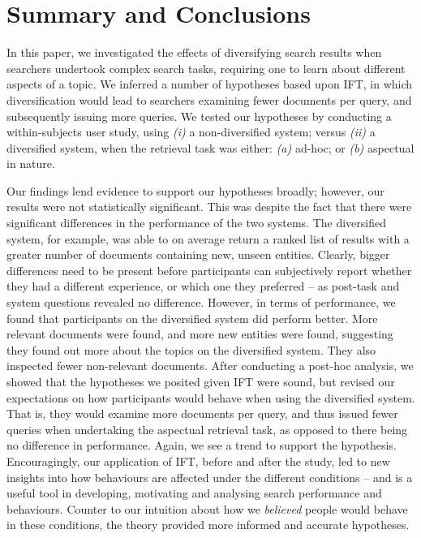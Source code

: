 \section{Summary and Conclusions} \label{sec:conclusion}

In this paper, we investigated the effects of diversifying search results when searchers undertook complex search tasks, requiring one to learn about different aspects of a topic. We inferred a number of hypotheses based upon IFT, in which diversification would lead to searchers examining fewer documents per query, and subsequently issuing more queries. We tested our hypotheses by conducting a within-subjects user study, using \emph{(i)} a non-diversified system; versus \emph{(ii)} a diversified system, when the retrieval task was either: \emph{(a)} ad-hoc; or \emph{(b)} aspectual in nature.

Our findings lend evidence to support our hypotheses broadly; however, our results were not statistically significant. This was despite the fact that there were significant differences in the performance of the two systems. The diversified system, for example, was able to on average return a ranked list of results with a greater number of documents containing new, unseen entities. Clearly, bigger differences need to be present before participants can subjectively report whether they had a different experience, or which one they preferred -- as post-task and system questions revealed no difference. However, in terms of performance, we found that participants on the diversified system did perform better. More relevant documents were found, and more new entities were found, suggesting they found out more about the topics on the diversified system. They also inspected fewer non-relevant documents. After conducting a post-hoc analysis, we showed that the hypotheses we posited given IFT were sound, but revised our expectations on how participants would behave when using the diversified system. That is, they would examine more documents per query, and thus issued fewer queries when undertaking the aspectual retrieval task, as opposed to there being no difference in performance. Again, we see a trend to support the hypothesis. Encouragingly, our application of IFT, before and after the study, led to new insights into how behaviours are affected under the different conditions -- and is a useful tool in developing, motivating and analysing search performance and behaviours. Counter to our intuition about how we \emph{believed} people would behave in these conditions, the theory provided more informed and accurate hypotheses.

